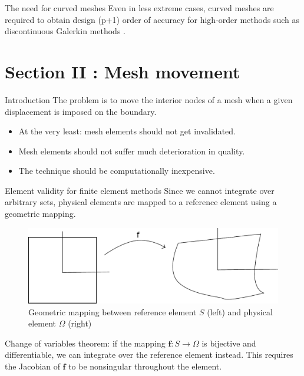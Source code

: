 \documentclass[t,12pt]{beamer}
\let\bld\boldsymbol
\begin{document}
\begin{frame}{The need for curved meshes}
Even in less extreme cases, curved meshes are required to obtain design (p+1) order of accuracy for high-order methods such as discontinuous Galerkin methods .
\end{frame}

\section{Section II : Mesh movement}

\begin{frame}{Introduction}
The problem is to move the interior nodes of a mesh when a given displacement is imposed on the boundary.
\begin{itemize}
	\item At the very least: mesh elements should not get invalidated.
	\item Mesh elements should not suffer much deterioration in quality.
	\item The technique should be computationally inexpensive.
\end{itemize}
\end{frame}

\begin{frame}{Element validity for finite element methods}
Since we cannot integrate over arbitrary sets, physical elements are mapped to a reference element using a geometric mapping.
\begin{figure}
	\includegraphics[scale=0.3]{geommapping}
	\caption{Geometric mapping between reference element $S$ (left) and physical element $\Omega$ (right)}
\end{figure}
Change of variables theorem: if the mapping $\bld{f}:S\rightarrow\Omega$ is bijective and differentiable, we can integrate over the reference element instead. This requires the Jacobian of $\bld{f}$ to be nonsingular throughout the element.
\end{frame}
\end{document}
